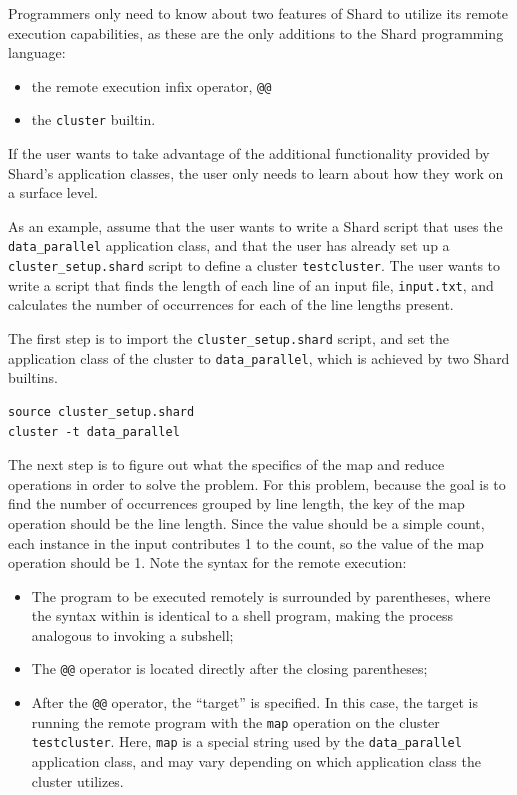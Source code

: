 \documentclass[oneside]{report}
\begin{document}
Programmers only need to know about two features of Shard to utilize its remote execution capabilities, as these are the only additions to the Shard programming language:
\begin{itemize}
  \item the remote execution infix operator, \texttt{@@}
  \item the \texttt{cluster} builtin.
\end{itemize}
If the user wants to take advantage of the additional functionality provided by Shard's application classes, the user only needs to learn about how they work on a surface level.

As an example, assume that the user wants to write a Shard script that uses the \texttt{data\_parallel} application class, and that the user has already set up a \texttt{cluster\_setup.shard} script to define a cluster \texttt{testcluster}.
The user wants to write a script that finds the length of each line of an input file, \texttt{input.txt}, and calculates the number of occurrences for each of the line lengths present.

The first step is to import the \texttt{cluster\_setup.shard} script, and set the application class of the cluster to \texttt{data\_parallel}, which is achieved by two Shard builtins.

\begin{minipage}[c]{\textwidth-15pt}
  \begin{lstlisting}[language=Shard]
source cluster_setup.shard
cluster -t data_parallel
\end{lstlisting}
  \smallskip
\end{minipage}

The next step is to figure out what the specifics of the map and reduce operations in order to solve the problem.
For this problem, because the goal is to find the number of occurrences grouped by line length, the key of the map operation should be the line length.
Since the value should be a simple count, each instance in the input contributes 1 to the count, so the value of the map operation should be 1.
Note the syntax for the remote execution:
\begin{itemize}
  \item The program to be executed remotely is surrounded by parentheses, where the syntax within is identical to a shell program, making the process analogous to invoking a subshell;
  \item The \texttt{@@} operator is located directly after the closing parentheses;
  \item After the \texttt{@@} operator, the ``target'' is specified. In this case, the target is running the remote program with the \texttt{map} operation on the cluster \texttt{testcluster}. Here, \texttt{map} is a special string used by the \texttt{data\_parallel} application class, and may vary depending on which application class the cluster utilizes.
\end{itemize}
\end{document}
